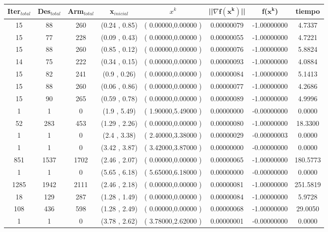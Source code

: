 \begin{itemize}
\begin{table}[H]
\centering
\renewcommand{\arraystretch}{1.2} %
\begin{tabular}{|c|c|c|c|c|c|c|c|}
\hline
\textbf{Iter$_{total}$} &\textbf{Des$_{total}$}&\textbf{Arm$_{total}$} & \textbf{x$_{inicial}$}& \textbf{$x^k$} & \textbf{||$\nabla \mathbf{f(x^k)}$}|| & \textbf{f($\mathbf{x^k}$)} & \textbf{tiempo} \\
\hline
15  & 88 &260 & (0.24 , 0.85) &( 0.00000,0.00000 ) & 0.00000079 & -1.00000000 & 4.7337 \\
15  & 77 &228 & (0.09 , 0.43) &( 0.00000,0.00000 ) & 0.00000055 & -1.00000000 & 4.7221 \\
15  & 88 &260 & (0.85 , 0.12) &( 0.00000,0.00000 ) & 0.00000076 & -1.00000000 & 5.8824 \\
14  & 75 &222 & (0.34 , 0.15) &( 0.00000,0.00000 ) & 0.00000093 & -1.00000000 & 4.0884 \\
15  & 82 &241 & (0.9 , 0.26) &( 0.00000,0.00000 ) & 0.00000084 & -1.00000000 & 5.1413 \\
15  & 88 &260 & (0.06 , 0.86) &( 0.00000,0.00000 ) & 0.00000077 & -1.00000000 & 4.2686 \\
15  & 90 &265 & (0.59 , 0.78) &( 0.00000,0.00000 ) & 0.00000089 & -1.00000000 & 4.9996 \\
1  & 1 &0 & (1.9 , 5.49) &( 1.90000,5.49000 ) & 0.00000000 & -0.00000000 & 0.0000 \\
52  & 283 &453 & (1.29 , 2.26) &( 0.00000,0.00000 ) & 0.00000080 & -1.00000000 & 18.3300 \\
1  & 1 &0 & (2.4 , 3.38) &( 2.40000,3.38000 ) & 0.00000029 & -0.00000003 & 0.0000 \\
1  & 1 &0 & (3.42 , 3.87) &( 3.42000,3.87000 ) & 0.00000000 & -0.00000000 & 0.0000 \\
851  & 1537 &1702 & (2.46 , 2.07) &( 0.00000,0.00000 ) & 0.00000065 & -1.00000000 & 180.5773 \\
1  & 1 &0 & (5.65 , 6.18) &( 5.65000,6.18000 ) & 0.00000000 & -0.00000000 & 0.0000 \\
1285  & 1942 &2111 & (2.46 , 2.18) &( 0.00000,0.00000 ) & 0.00000081 & -1.00000000 & 251.5819 \\
18  & 129 &287 & (1.28 , 1.49) &( 0.00000,0.00000 ) & 0.00000084 & -1.00000000 & 5.9728 \\
108  & 436 &598 & (1.28 , 2.49) &( 0.00000,0.00000 ) & 0.00000068 & -1.00000000 & 29.0050 \\
1  & 1 &0 & (3.78 , 2.62) &( 3.78000,2.62000 ) & 0.00000001 & -0.00000000 & 0.0000 \\
\hline
\end{tabular}
\end{table}


\end{itemize}
